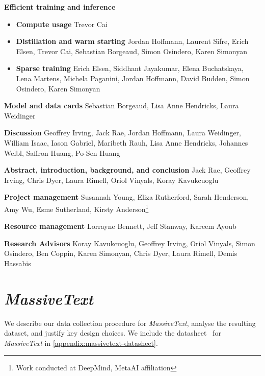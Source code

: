 \documentclass[11pt, a4paper, logo, internal, copyright, nonumbering]{deepmind}
\newcommand{\massivetext}{\textit{MassiveText}\xspace}
\begin{document}
\textbf{Efficient training and inference}
\begin{itemize}[label={},noitemsep,topsep=0pt]
\item \textbf{Compute usage}
Trevor Cai
\item \textbf{Distillation and warm starting}
Jordan Hoffmann, Laurent Sifre, Erich Elsen, Trevor Cai, Sebastian Borgeaud, Simon Osindero, Karen Simonyan
\item \textbf{Sparse training} 
Erich Elsen, Siddhant Jayakumar, Elena Buchatskaya, Lena Martens, Michela Paganini, Jordan Hoffmann, David Budden, Simon Osindero, Karen Simonyan
\end{itemize}

\noindent \textbf{Model and data cards}
Sebastian Borgeaud, Lisa Anne Hendricks, Laura Weidinger

\noindent \textbf{Discussion}
Geoffrey Irving, Jack Rae, Jordan Hoffmann, Laura Weidinger, William Isaac, Iason Gabriel, Maribeth Rauh, Lisa Anne Hendricks, Johannes Welbl, Saffron Huang, Po-Sen Huang

\noindent \textbf{Abstract, introduction, background, and conclusion}
Jack Rae, Geoffrey Irving, Chris Dyer, Laura Rimell, Oriol Vinyals, Koray Kavukcuoglu

\noindent \textbf{Project management}
Susannah Young, Eliza Rutherford, Sarah Henderson, Amy Wu, Esme Sutherland, Kirsty Anderson\footnote{Work conducted at DeepMind, MetaAI affiliation}

\noindent \textbf{Resource management}
Lorrayne Bennett, Jeff Stanway, Kareem Ayoub

\noindent \textbf{Research Advisors} Koray Kavukcuoglu, Geoffrey Irving, Oriol Vinyals, Simon Osindero, Ben Coppin, Karen Simonyan, Chris Dyer, Laura Rimell, Demis Hassabis



\newpage
\appendix
\setcounter{figure}{0}
\makeatletter 
\renewcommand{\thefigure}{A\@arabic\c@figure}
\makeatother

\setcounter{table}{0}
\makeatletter 
\renewcommand{\thetable}{A\@arabic\c@table}
\makeatother

\section{\massivetext}
\label{appendix:massive-text}
We describe our data collection procedure for \massivetext, analyse the resulting dataset, and justify key design choices. 
We include the datasheet~\citep{gebru2018datasheets} for \massivetext in \autoref{appendix:massivetext-datasheet}.
\end{document}
